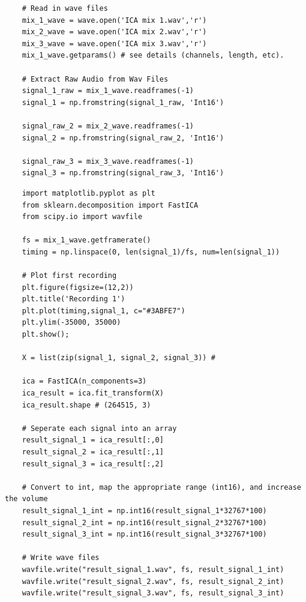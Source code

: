 \documentclass[11pt, a4paper]{article}
\begin{document}
\begin{spacing}{1.1}
\begin{lstlisting}
	# Read in wave files
	mix_1_wave = wave.open('ICA mix 1.wav','r')
	mix_2_wave = wave.open('ICA mix 2.wav','r')
	mix_3_wave = wave.open('ICA mix 3.wav','r')
	mix_1_wave.getparams() # see details (channels, length, etc).
	
	# Extract Raw Audio from Wav Files
	signal_1_raw = mix_1_wave.readframes(-1)
	signal_1 = np.fromstring(signal_1_raw, 'Int16')

	signal_raw_2 = mix_2_wave.readframes(-1)
	signal_2 = np.fromstring(signal_raw_2, 'Int16')

	signal_raw_3 = mix_3_wave.readframes(-1)
	signal_3 = np.fromstring(signal_raw_3, 'Int16')	\end{lstlisting} \newpage

	\begin{lstlisting}	
	import matplotlib.pyplot as plt
	from sklearn.decomposition import FastICA
	from scipy.io import wavfile
	
	fs = mix_1_wave.getframerate()
	timing = np.linspace(0, len(signal_1)/fs, num=len(signal_1))
	
	# Plot first recording
	plt.figure(figsize=(12,2))
	plt.title('Recording 1')
	plt.plot(timing,signal_1, c="#3ABFE7")
	plt.ylim(-35000, 35000)
	plt.show();
	
	X = list(zip(signal_1, signal_2, signal_3)) #
	
	ica = FastICA(n_components=3)
	ica_result = ica.fit_transform(X)
	ica_result.shape # (264515, 3)
	
	# Seperate each signal into an array
	result_signal_1 = ica_result[:,0]
	result_signal_2 = ica_result[:,1]
	result_signal_3 = ica_result[:,2]
	
	# Convert to int, map the appropriate range (int16), and increase the volume
	result_signal_1_int = np.int16(result_signal_1*32767*100)
	result_signal_2_int = np.int16(result_signal_2*32767*100)
	result_signal_3_int = np.int16(result_signal_3*32767*100)
	
	# Write wave files
	wavfile.write("result_signal_1.wav", fs, result_signal_1_int)
	wavfile.write("result_signal_2.wav", fs, result_signal_2_int)
	wavfile.write("result_signal_3.wav", fs, result_signal_3_int)
	\end{lstlisting}
	
	
	
	
	
	
	
\end{spacing}
\end{document}
